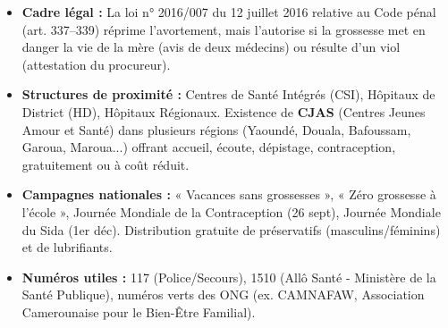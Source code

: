\documentclass[11pt]{article}
\begin{document}
\begin{savaistu}
\begin{itemize}
\item \textbf{Cadre légal :} La loi n° 2016/007 du 12 juillet 2016 relative au Code pénal (art. 337--339) réprime l'avortement, mais l'autorise si la grossesse met en danger la vie de la mère (avis de deux médecins) ou résulte d'un viol (attestation du procureur).
\item \textbf{Structures de proximité :} Centres de Santé Intégrés (CSI), Hôpitaux de District (HD), Hôpitaux Régionaux. Existence de \textbf{CJAS} (Centres Jeunes Amour et Santé) dans plusieurs régions (Yaoundé, Douala, Bafoussam, Garoua, Maroua...) offrant accueil, écoute, dépistage, contraception, gratuitement ou à coût réduit.
\item \textbf{Campagnes nationales :} « Vacances sans grossesses », « Zéro grossesse à l'école », Journée Mondiale de la Contraception (26 sept), Journée Mondiale du Sida (1er déc). Distribution gratuite de préservatifs (masculins/féminins) et de lubrifiants.
\item \textbf{Numéros utiles :} 117 (Police/Secours), 1510 (Allô Santé - Ministère de la Santé Publique), numéros verts des ONG (ex. CAMNAFAW, Association Camerounaise pour le Bien-Être Familial).
\end{itemize}
\end{savaistu}
\end{document}
